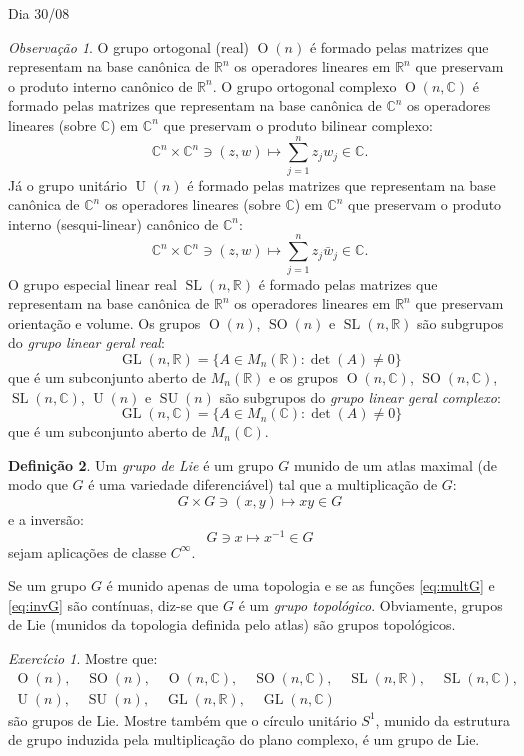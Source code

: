 \documentclass[oneside,11pt]{amsart}
\newcommand{\R}{\mathds R}
\newcommand{\C}{\mathds C}
\DeclareMathOperator{\Or}{O}
\DeclareMathOperator{\SO}{SO}
\DeclareMathOperator{\Ur}{U}
\DeclareMathOperator{\GL}{GL}
\DeclareMathOperator{\SL}{SL}
\DeclareMathOperator{\SU}{SU}
\theoremstyle{remark}\newtheorem{exercise}{Exercício}[section]
\theoremstyle{plain}\newtheorem{teo}{Teorema}[section]
\theoremstyle{plain}\newtheorem{lem}[teo]{Lema}
\theoremstyle{plain}\newtheorem{prop}[teo]{Proposição}
\theoremstyle{definition}\newtheorem{defin}[teo]{Definição}
\theoremstyle{remark}\newtheorem{rem}[teo]{Observação}
\theoremstyle{definition}\newtheorem{example}[teo]{Exemplo}
\numberwithin{equation}{section}
\begin{document}
\begin{section}{Dia 30/08}
\begin{rem}
O grupo ortogonal (real) $\Or(n)$ é formado pelas matrizes que representam na base canônica de $\R^n$
os operadores lineares em $\R^n$ que preservam o produto interno canônico de $\R^n$. O grupo ortogonal complexo
$\Or(n,\C)$ é formado pelas matrizes que representam na base canônica de $\C^n$ os operadores lineares (sobre $\C$)
em $\C^n$ que preservam o produto bilinear complexo:
\begin{equation}\label{eq:prodbilincompl}
\C^n\times\C^n\ni(z,w)\longmapsto\sum_{j=1}^nz_jw_j\in\C.
\end{equation}
Já o grupo unitário $\Ur(n)$ é formado pelas matrizes que representam na base canônica de $\C^n$ os operadores
lineares (sobre $\C$) em $\C^n$ que preservam o produto interno (sesqui-linear) canônico de $\C^n$:
\[\C^n\times\C^n\ni(z,w)\longmapsto\sum_{j=1}^nz_j\bar w_j\in\C.\]
O grupo especial linear real $\SL(n,\R)$ é formado pelas matrizes que representam na base canônica de $\R^n$ os
operadores lineares em $\R^n$ que preservam orientação e volume. Os grupos $\Or(n)$, $\SO(n)$ e $\SL(n,\R)$
são subgrupos do {\em grupo linear geral real}:
\[\GL(n,\R)=\big\{A\in M_n(\R):\det(A)\ne0\big\}\]
que é um subconjunto aberto de $M_n(\R)$ e os grupos $\Or(n,\C)$, $\SO(n,\C)$, $\SL(n,\C)$, $\Ur(n)$ e $\SU(n)$
são subgrupos do {\em grupo linear geral complexo}:
\[\GL(n,\C)=\big\{A\in M_n(\C):\det(A)\ne0\big\}\]
que é um subconjunto aberto de $M_n(\C)$.
\end{rem}

\begin{defin}
Um {\em grupo de Lie\/} é um grupo $G$ munido de um atlas maximal (de modo que $G$ é uma variedade diferenciável)
tal que a multiplicação de $G$:
\begin{equation}\label{eq:multG}
G\times G\ni(x,y)\longmapsto xy\in G
\end{equation}
e a inversão:
\begin{equation}\label{eq:invG}
G\ni x\longmapsto x^{-1}\in G
\end{equation}
sejam aplicações de classe $C^\infty$.
\end{defin}
Se um grupo $G$ é munido apenas de uma topologia e se as funções \eqref{eq:multG} e \eqref{eq:invG} são contínuas,
diz-se que $G$ é um {\em grupo topológico}. Obviamente, grupos de Lie (munidos da topologia definida pelo atlas)
são grupos topológicos.

\begin{exercise}
Mostre que:
\begin{gather*}
\Or(n),\quad\SO(n),\quad\Or(n,\C),\quad\SO(n,\C),\quad\SL(n,\R),\quad\SL(n,\C),\\
\Ur(n),\quad\SU(n),\quad\GL(n,\R),\quad\GL(n,\C)
\end{gather*}
são grupos de Lie. Mostre também que o círculo unitário $S^1$, munido da estrutura de
grupo induzida pela multiplicação do plano complexo, é um grupo de Lie.
\end{exercise}


\end{section}
\end{document}
